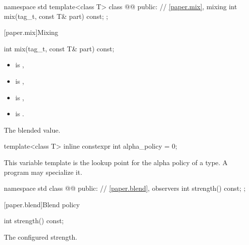 \begin{codeblock}
namespace std {
  template<class T>
  class @@ {
  public:
    // \ref{paper.mix}, mixing
    int mix(tag_t, const T& part) const;
  };
}
\end{codeblock}

[paper.mix]{Mixing}

%
\begin{itemdecl}
int mix(tag_t, const T& part) const;
\end{itemdecl}

\begin{itemdescr}
\pnum
\constraints
\begin{itemize}
\item {} is ,
\item {} is ,
\item {} is ,
\item {} is .
\end{itemize}

\pnum
\returns
The blended value.
\end{itemdescr}

%
\begin{itemdecl}
template<class T>
  inline constexpr int alpha_policy = 0;
\end{itemdecl}

\begin{itemdescr}
\pnum
\remarks
This variable template is the lookup point for the alpha policy of a type. A program may specialize it.
\end{itemdescr}

\begin{codeblock}
namespace std {
  class @@ {
  public:
    // \ref{paper.blend}, observers
    int strength() const;
  };
}
\end{codeblock}

[paper.blend]{Blend policy}

%
\begin{itemdecl}
int strength() const;
\end{itemdecl}

\begin{itemdescr}
\pnum
\returns
The configured strength.
\end{itemdescr}
